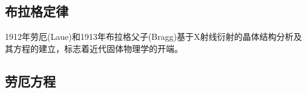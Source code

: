
\subsection{布拉格定律}
1912年劳厄(Laue)和1913年布拉格父子(Bragg)基于X射线衍射的晶体结构分析及其方程的建立，标志着近代固体物理学的开端。


\subsection{劳厄方程}